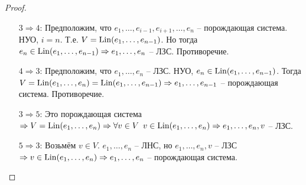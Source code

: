 \begin{proof}
\begin{itemize}
        \item[$3 \Rightarrow 4$:] Предположим, что $e_1, \dots, e_{i-1},
        e_{i+1}, \dots, e_n$ -- порождающая система. НУО, $i = n$.
        Т.е. $V = \operatorname{Lin}(e_1, \dots, e_{n-1})$. Но тогда $e_n \in
        \operatorname{Lin}(e_1, \dots, e_{n-1}) \Rightarrow e_1, \dots, e_n$ -- ЛЗС.
        Противоречие.

        \item[$4 \Rightarrow 3$:] Предположим, что $e_1, \dots, e_n$ --
        ЛЗС. НУО, $e_n \in \operatorname{Lin}(e_1, \dots, e_{n-1})$. Тогда
        $V = \operatorname{Lin}(e_1, \dots, e_n) = \operatorname{Lin}(e_1, \dots, e_{n-1})
        \Rightarrow e_1, \dots, e_{n-1}$ -- порождающая система.
        Противоречие.

        \item[$3 \Rightarrow 5$:] Это порождающая система $\Rightarrow
        V = \operatorname{Lin}(e_1, \dots, e_n) \Rightarrow \forall v \in V \,\,\,
        v \in \operatorname{Lin}(e_1, \dots, e_n) \Rightarrow\\ e_1, \dots, e_n, v$ --
        ЛЗС.

        \item[$5 \Rightarrow 3$:] Возьмём $v \in V$. $e_1, \dots, e_n$ --
        ЛНС, но $e_1, \dots, e_n, v$ -- ЛЗС $\Rightarrow v \in
        \operatorname{Lin}(e_1, \dots, e_n) \Rightarrow e_1, \dots, e_n$ -- порождающая
        система.
    \end{itemize}
\end{proof}